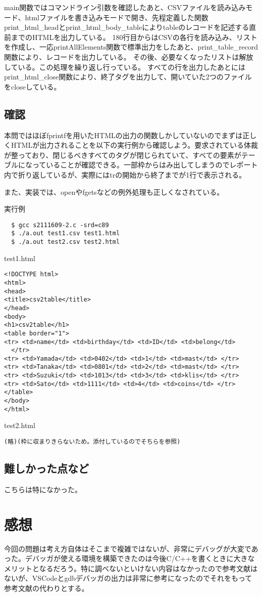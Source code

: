 \documentclass[dvipdfmx,12pt,a4j]{jarticle}
\begin{document}
main関数ではコマンドライン引数を確認したあと、CSVファイルを読み込みモード、htmlファイルを書き込みモードで開き、先程定義した関数print\_html\_headとprint\_html\_body\_tableによりtableのレコードを記述する直前までのHTMLを出力している。
180行目からはCSVの各行を読み込み、リストを作成し、一応printAllElements関数で標準出力をしたあと、print\_table\_record関数により、レコードを出力している。
その後、必要なくなったリストは解放している。この処理を繰り返し行っている。
すべての行を出力したあとにはprint\_html\_close関数により、終了タグを出力して、開いていた2つのファイルをcloseしている。



\subsection{確認}
本問ではほぼfprintfを用いたHTMLの出力の関数しかしていないのでまずは正しくHTMLが出力されることを以下の実行例から確認しよう。要求されている体裁が整っており、閉じるべきすべてのタグが閉じられていて、すべての要素がテーブルになっていることが確認できる。一部枠からはみ出してしまうのでレポート内で折り返しているが、実際にはtrの開始から終了までが1行で表示される。

また、実装では、openやfgetsなどの例外処理も正しくなされている。

\begin{itembox}[l]{実行例}
\begin{verbatim}
  $ gcc s2111609-2.c -srd=c89
  $ ./a.out test1.csv test1.html
  $ ./a.out test2.csv test2.html
\end{verbatim}
\end{itembox}


\begin{itembox}[l]{test1.html}
\begin{verbatim}
<!DOCTYPE html>
<html>
<head>
<title>csv2table</title>
</head>
<body>
<h1>csv2table</h1>
<table border="1">
<tr> <td>name</td> <td>birthday</td> <td>ID</td> <td>belong</td>
  </tr>
<tr> <td>Yamada</td> <td>0402</td> <td>1</td> <td>mast</td> </tr>
<tr> <td>Tanaka</td> <td>0801</td> <td>2</td> <td>mast</td> </tr>
<tr> <td>Suzuki</td> <td>1013</td> <td>3</td> <td>klis</td> </tr>
<tr> <td>Sato</td> <td>1111</td> <td>4</td> <td>coins</td> </tr>
</table>
</body>
</html>  
\end{verbatim}
\end{itembox}

\begin{itembox}[l]{test2.html}
\begin{verbatim}
(略)(枠に収まりきらないため。添付しているのでそちらを参照)
\end{verbatim}
\end{itembox}

\subsection{難しかった点など}
こちらは特になかった。


\section{感想}
今回の問題は考え方自体はそこまで複雑ではないが、非常にデバッグが大変であった。デバッガが使える環境を構築できたのは今後C/C++を書くときに大きなメリットとなるだろう。特に調べないといけない内容はなかったので参考文献はないが、VSCodeとgdbデバッガの出力は非常に参考になったのでそれをもって参考文献の代わりとする。
\end{document}
